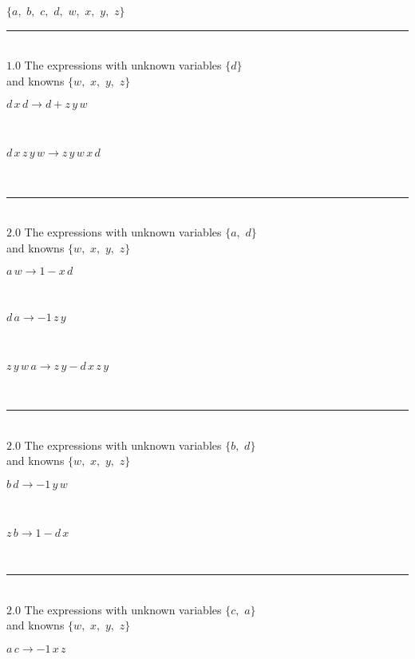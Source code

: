 \documentclass[rep10,leqno]{report}
\begin{document}
$\{a,
$ $
b,
$ $
c,
$ $
d,
$ $
w,
$ $
x,
$ $
y,
$ $
z\}$
\smallskip\\
\rule[3pt]{6in}{.7pt}\\
$1.0$  The expressions with unknown variables $\{d\}$\\
and knowns $\{w,
$ $
x,
$ $
y,
$ $
z\}$\smallskip\\
\begin{minipage}{6in}
$
d\,
 x\,
 d\rightarrow d + z\,
 y\,
 w
$
\end{minipage}\medskip \\
\begin{minipage}{6in}
$
d\,
 x\,
 z\,
 y\,
 w\rightarrow z\,
 y\,
 w\,
 x\,
 d
$
\end{minipage}\\
\rule[3pt]{6in}{.7pt}\\
$2.0$  The expressions with unknown variables $\{a,
$ $
d\}$\\
and knowns $\{w,
$ $
x,
$ $
y,
$ $
z\}$\smallskip\\
\begin{minipage}{6in}
$
a\,
 w\rightarrow 1 - x\,
 d
$
\end{minipage}\medskip \\
\begin{minipage}{6in}
$
d\,
 a\rightarrow -1\,
 z\,
 y
$
\end{minipage}\medskip \\
\begin{minipage}{6in}
$
z\,
 y\,
 w\,
 a\rightarrow z\,
 y - d\,
 x\,
 z\,
 y
$
\end{minipage}\\
\rule[3pt]{6in}{.7pt}\\
$2.0$  The expressions with unknown variables $\{b,
$ $
d\}$\\
and knowns $\{w,
$ $
x,
$ $
y,
$ $
z\}$\smallskip\\
\begin{minipage}{6in}
$
b\,
 d\rightarrow -1\,
 y\,
 w
$
\end{minipage}\medskip \\
\begin{minipage}{6in}
$
z\,
 b\rightarrow 1 - d\,
 x
$
\end{minipage}\\
\rule[3pt]{6in}{.7pt}\\
$2.0$  The expressions with unknown variables $\{c,
$ $
a\}$\\
and knowns $\{w,
$ $
x,
$ $
y,
$ $
z\}$\smallskip\\
\begin{minipage}{6in}
$
a\,
 c\rightarrow -1\,
 x\,
 z
$
\end{minipage}\medskip \\
\end{document}
